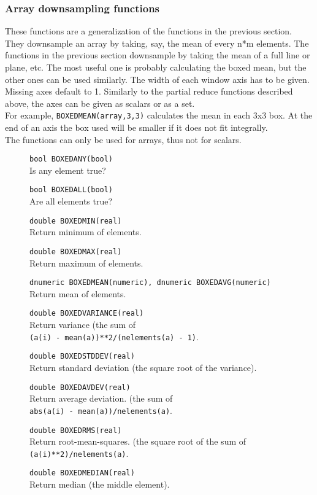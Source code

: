 \subsubsection{Array downsampling functions}
These functions are a generalization of the functions in the previous
section. They downsample an array by taking, say, the mean of every
n*m elements. The functions in the previous section downsample by
taking the mean of a full line or plane, etc.
The most useful one is probably calculating the boxed mean, but
the other ones can be used similarly.
The width of each window axis has to be given. Missing axes default to 1.
Similarly to the partial reduce functions described above, the axes
can be given as scalars or as a set.
\\For example,
\texttt{BOXEDMEAN(array,3,3)} calculates the mean
in each 3x3 box. At the end of an axis the box used will be smaller
if it does not fit integrally.
\\The functions can only be used for arrays, thus not for scalars.
\begin{description}
  \item[] \texttt{bool BOXEDANY(bool)}\\
    Is any element true?
  \item[] \texttt{bool BOXEDALL(bool)}\\
    Are all elements true?
  \item[] \texttt{double BOXEDMIN(real)}\\
    Return minimum of elements.
  \item[] \texttt{double BOXEDMAX(real)}\\
    Return maximum of elements.
  \item[] \texttt{dnumeric BOXEDMEAN(numeric), dnumeric BOXEDAVG(numeric)}\\
    Return mean of elements.
  \item[] \texttt{double BOXEDVARIANCE(real)}\\
    Return variance (the sum of
    \\\texttt{(a(i) - mean(a))**2/(nelements(a) - 1)}.
  \item[] \texttt{double BOXEDSTDDEV(real)}\\
    Return standard deviation (the square root of the variance).
  \item[] \texttt{double BOXEDAVDEV(real)}\\
    Return average deviation. (the sum of 
    \\\texttt{abs(a(i) - mean(a))/nelements(a)}.
  \item[] \texttt{double BOXEDRMS(real)}\\
    Return root-mean-squares. (the square root of the sum of
    \\\texttt{(a(i)**2)/nelements(a)}.
  \item[] \texttt{double BOXEDMEDIAN(real)}\\
    Return median (the middle element).
\end{description}

